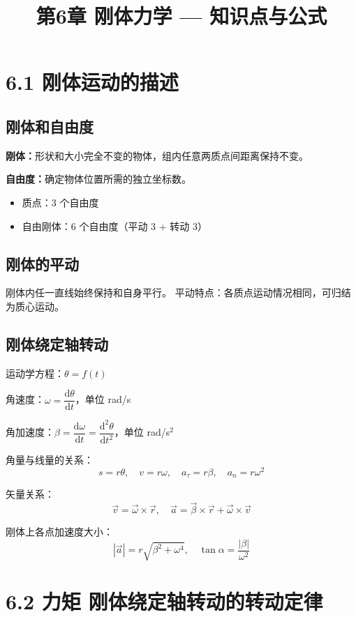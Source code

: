 \documentclass{ctexart}
\title{\textbf{第6章 刚体力学} --- 知识点与公式}
\author{}
\date{}
\begin{document}
\maketitle

\section*{6.1 刚体运动的描述}

\subsection*{刚体和自由度}
\textbf{刚体：}形状和大小完全不变的物体，组内任意两质点间距离保持不变。

\textbf{自由度：}确定物体位置所需的独立坐标数。
\begin{itemize}
  \item 质点：3 个自由度
  \item 自由刚体：6 个自由度（平动 3 + 转动 3）
\end{itemize}

\subsection*{刚体的平动}
刚体内任一直线始终保持和自身平行。
平动特点：各质点运动情况相同，可归结为质心运动。

\subsection*{刚体绕定轴转动}
运动学方程：$\theta = f(t)$

角速度：$\omega = \dfrac{\mathrm{d}\theta}{\mathrm{d}t}$，单位 rad/s

角加速度：$\beta = \dfrac{\mathrm{d}\omega}{\mathrm{d}t} = \dfrac{\mathrm{d}^{2}\theta}{\mathrm{d}t^{2}}$，单位 rad/s$^{2}$

角量与线量的关系：
\[
s = r\theta,\quad v = r\omega,\quad a_\tau = r\beta,\quad a_n = r\omega^{2}
\]

矢量关系：
\[
\vec{v} = \vec{\omega} \times \vec{r},\quad
\vec{a} = \vec{\beta} \times \vec{r} + \vec{\omega} \times \vec{v}
\]

刚体上各点加速度大小：
\[
|\vec{a}| = r\sqrt{\beta^{2} + \omega^{4}},\quad
\tan\alpha = \frac{|\beta|}{\omega^{2}}
\]

\section*{6.2 力矩 刚体绕定轴转动的转动定律}
\end{document}

